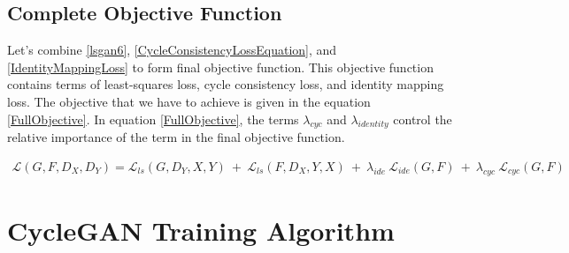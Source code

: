 \subsection{Complete Objective Function}

Let's combine \ref{lsgan6}, \ref{CycleConsistencyLossEquation}, and \ref{IdentityMappingLoss} to form final objective function. This objective function contains terms of least-squares loss, cycle consistency loss, and identity mapping loss. The objective that we have to achieve is given in the equation \ref{FullObjective}. In equation \ref{FullObjective}, the terms $\lambda_{cyc}$ and $\lambda_{identity}$ control the relative importance of the term in the final objective function.


\begin{equation}\label{FullObjective}
\begin{aligned}
    \mathcal{L}(G, F, D_X, D_Y) =  \mathcal{L}_{ls}(G, D_Y, X, Y)\ +\ \mathcal{L}_{ls}(F, D_X, Y, X)\ +\ 
    \lambda_{ide}\ \mathcal{L}_{ide}(G, F)\ +\ \lambda_{cyc}\ \mathcal{L}_{cyc}(G, F)
\end{aligned}
\end{equation}
    

\section{\ac{CycleGAN} Training Algorithm}\label{CycleGANAlgorithm}



